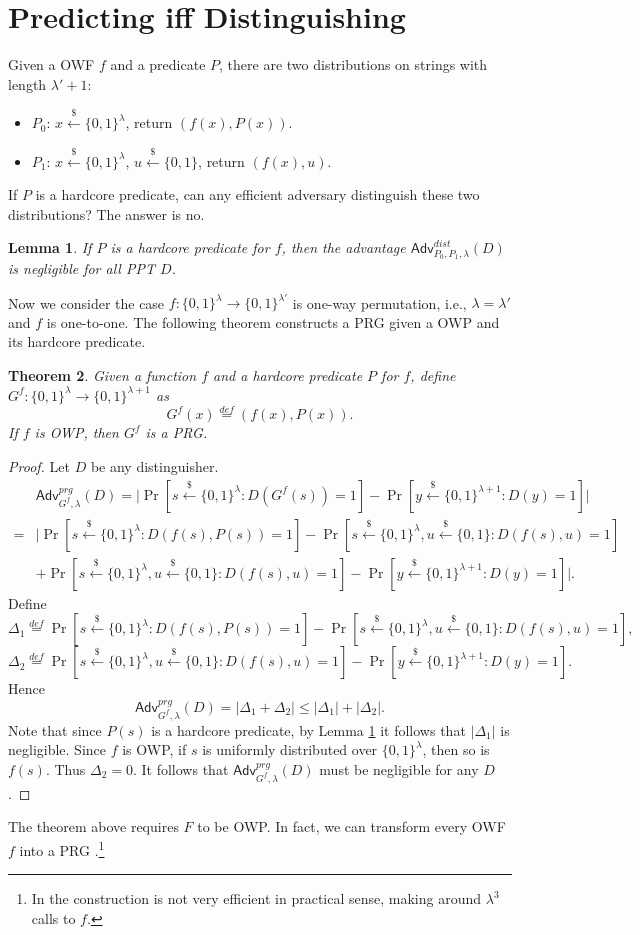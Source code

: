 \documentclass[12pt]{article}
\newcommand{\eqdef}{\stackrel{def}{=}}
\newcommand{\bits}{\{0,1\}}
\newcommand{\getsr}{\stackrel{\$}{\gets}}
\newcommand{\Adv}{\mathsf{Adv}}
\newtheorem{theorem}{Theorem}[section]
\newtheorem{lemma}[theorem]{Lemma}
\theoremstyle{definition}
\begin{document}
\section{Predicting iff Distinguishing}
Given a OWF $f$ and a predicate $P$, there are two distributions on strings with length $\lambda' + 1$:
\begin{itemize}
\item $P_0$: $x \getsr \bits^\lambda$, return $(f(x), P(x))$.
\item $P_1$: $x \getsr \bits^\lambda$, $u \getsr \bits$, return $(f(x), u)$.
\end{itemize}
If $P$ is a hardcore predicate, can any efficient adversary distinguish these two distributions? The answer is no.
\begin{lemma}
\label{lem:pred}
If $P$ is a hardcore predicate for $f$, then the advantage $\Adv_{P_0,P_1,\lambda}^{dist}(D)$ is negligible for all PPT $D$.
\end{lemma}

Now we consider the case $f : \bits^\lambda \to \bits^{\lambda'}$ is one-way permutation, i.e., $\lambda = \lambda'$ and $f$ is one-to-one.
The following theorem constructs a PRG given a OWP and its hardcore predicate.
\begin{theorem}
Given a function $f$ and a hardcore predicate $P$ for $f$, define $G^f : \bits^\lambda \to \bits^{\lambda+1}$ as
$$G^f(x) \eqdef (f(x), P(x)).$$
If $f$ is OWP, then $G^f$ is a PRG.
\end{theorem}
\begin{proof}
Let $D$ be any distinguisher.
$$\begin{aligned}
&\Adv_{G^f, \lambda}^{prg}(D) 
=\bigg| \Pr[s \getsr \bits^\lambda : D(G^f(s)) = 1] - \Pr[y \getsr \bits^{\lambda+1} : D(y) = 1] \bigg| \\
=&\bigg| \Pr[s \getsr \bits^\lambda : D(f(s), P(s)) = 1] - \Pr[s \getsr \bits^\lambda, u \getsr \bits : D(f(s), u) = 1] \\
&+ \Pr[s \getsr \bits^\lambda, u \getsr \bits : D(f(s), u) = 1] - \Pr[y \getsr \bits^{\lambda+1} : D(y) = 1] \bigg|.
\end{aligned}$$
Define
$$\Delta_1 \eqdef \Pr[s \getsr \bits^\lambda : D(f(s), P(s)) = 1] - \Pr[s \getsr \bits^\lambda, u \getsr \bits : D(f(s), u) = 1],$$
$$\Delta_2 \eqdef \Pr[s \getsr \bits^\lambda, u \getsr \bits : D(f(s), u) = 1] - \Pr[y \getsr \bits^{\lambda+1} : D(y) = 1].$$
Hence 
$$\Adv_{G^f, \lambda}^{prg}(D) = |\Delta_1 + \Delta_2| \leq |\Delta_1| + |\Delta_2|.$$
Note that since $P(s)$ is a hardcore predicate, by Lemma \ref{lem:pred} it follows that $|\Delta_1|$ is negligible. Since $f$ is OWP, if $s$ is uniformly distributed over $\bits^\lambda$, then so is $f(s)$. Thus $\Delta_2 = 0$. It follows that $\Adv_{G^f, \lambda}^{prg}(D)$ must be negligible for any $D$.
\end{proof}
The theorem above requires $F$ to be OWP. In fact, we can transform every OWF $f$ into a PRG \cite{HILL99}.\footnote{In \cite{HILL99} the construction is not very efficient in practical sense, making around $\lambda^3$ calls to $f$.}
\end{document}
